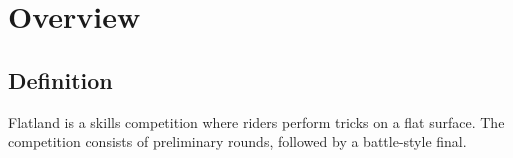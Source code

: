 \chapter{Overview}

\section{Definition}

Flatland is a skills competition where riders perform tricks on a flat surface.
The competition consists of preliminary rounds, followed by a battle-style final.
